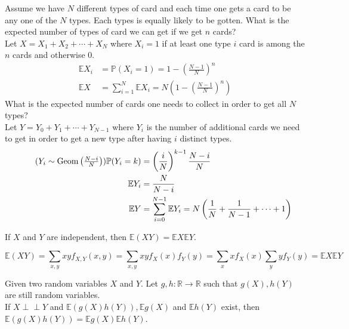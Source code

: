 \documentclass{huhtakm-template-book}
\newcommand{\independent}{\perp\!\!\!\perp}
\newcommand{\prob}{\mathbb{P}}
\newcommand{\expect}{\mathbb{E}}
\DeclareMathOperator{\Geom}{Geom}
\begin{document}
    \begin{eg}
        Assume we have $N$ different types of card and each time one gets a card to be any one of the $N$ types. Each types is equally likely to be gotten. What is the expected number of types of card we can get if we get $n$ cards?\\
        Let $X=X_{1}+X_{2}+\cdots+X_{N}$ where $X_{i}=1$ if at least one type $i$ card is among the $n$ cards and otherwise $0$.
        \begin{align*}
            \expect X_{i}&=\prob(X_{i}=1)=1-\left(\frac{N-1}{N}\right)^{n}\\
            \expect X&=\sum_{i=1}^{N}\expect X_{i}=N\left(1-\left(\frac{N-1}{N}\right)^{n}\right)
        \end{align*}
        What is the expected number of cards one needs to collect in order to get all $N$ types?\\
        Let $Y=Y_{0}+Y_{1}+\cdots+Y_{N-1}$ where $Y_{i}$ is the number of additional cards we need to get in order to get a new type after having $i$ distinct types.
        \begin{align*}
            \tag{$Y_{i}\sim\Geom\left(\frac{N-i}{N}\right)$}
            \prob(Y_{i}=k)&=\left(\frac{i}{N}\right)^{k-1}\frac{N-i}{N}\\
            \expect Y_{i}&=\frac{N}{N-i}\\
            \expect Y&=\sum_{i=0}^{N-1}\expect Y_{i}=N\left(\frac{1}{N}+\frac{1}{N-1}+\cdots+1\right)
        \end{align*}
    \end{eg}
    \begin{lem}
        If $X$ and $Y$ are independent, then $\expect(XY)=\expect X\expect Y$.
    \end{lem}
    \begin{proofing}
        \begin{equation*}
            \expect(XY)=\sum_{x,y}xyf_{X,Y}(x,y)=\sum_{x,y}xyf_{X}(x)f_{Y}(y)=\sum_{x}xf_{X}(x)\sum_{y}yf_{Y}(y)=\expect X\expect Y
        \end{equation*}
    \end{proofing}
    \begin{lem}
        Given two random variables $X$ and $Y$. Let $g,h:\mathbb{R}\to\mathbb{R}$ such that $g(X),h(Y)$ are still random variables.\\
        If $X\independent Y$ and $\expect(g(X)h(Y)),\expect g(X)$ and $\expect h(Y)$ exist, then $\expect(g(X)h(Y))=\expect g(X)\expect h(Y)$.
    \end{lem}
\end{document}
